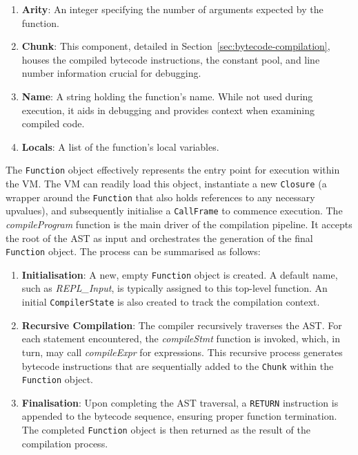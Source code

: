 \begin{enumerate}
    \item \textbf{Arity}: An integer specifying the number of arguments expected by the function.
    \item \textbf{Chunk}: This component, detailed in Section~\ref{sec:bytecode-compilation}, houses the compiled bytecode instructions, the constant pool, and line number information crucial for debugging.
    \item \textbf{Name}: A string holding the function's name.
    While not used during execution, it aids in debugging and provides context when examining compiled code.
    \item \textbf{Locals}: A list of the function's local variables.
\end{enumerate}
The \texttt{Function} object effectively represents the entry point for execution within the VM. The VM can readily 
load this object, instantiate a new \texttt{Closure} (a wrapper around the \texttt{Function} that also holds references to any necessary upvalues), and subsequently initialise a \texttt{CallFrame} to commence execution.
The \textit{compileProgram} function is the main driver of the compilation pipeline.
It accepts the root of the AST as input and orchestrates the generation of the final \texttt{Function} object.
The process can be summarised as follows:

\begin{enumerate}
    \item \textbf{Initialisation}: A new, empty \texttt{Function} object is created.
    A default name, such as \textit{REPL\_Input}, is typically assigned to this top-level function.
    An initial \texttt{CompilerState} is also created to track the compilation context.
    \item \textbf{Recursive Compilation}: The compiler recursively traverses the AST. For each statement 
    encountered, the \textit{compileStmt} function is invoked, which, in turn, may call \textit{compileExpr} for expressions. 
    This recursive process generates bytecode instructions that are sequentially added to the \texttt{Chunk} within the \texttt{Function} object.
    \item \textbf{Finalisation}: Upon completing the AST traversal, a \texttt{RETURN} instruction is appended to the 
    bytecode sequence, ensuring proper function termination.
    The completed \texttt{Function} object is then returned as the result of the compilation process.
\end{enumerate}

